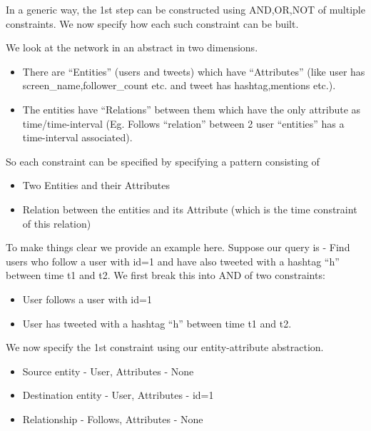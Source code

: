 \documentclass[letterpaper,10pt,english]{sphinxmanual}
\begin{document}
In a generic way, the 1st step can be constructed using AND,OR,NOT of multiple constraints. We now specify how each such constraint can be built.

We look at the network in an abstract in two dimensions.
\begin{itemize}
\item {} 
There are “Entities” (users and tweets) which have “Attributes” (like user has screen\_name,follower\_count etc. and tweet has hashtag,mentions etc.).

\item {} 
The entities have “Relations” between them which have the only attribute as time/time-interval (Eg. Follows “relation” between 2 user “entities” has a time-interval associated).

\end{itemize}

So each constraint can be specified by specifying a pattern consisting of
\begin{itemize}
\item {} 
Two Entities and their Attributes

\item {} 
Relation between the entities and its Attribute (which is the time constraint of this relation)

\end{itemize}

To make things clear we provide an example here.
Suppose our query is - Find users who follow a user with id=1 and have also tweeted with a hashtag “h” between time t1 and t2.
We first break this into AND of two constraints:
\begin{itemize}
\item {} 
User follows a user with id=1

\item {} 
User has tweeted with a hashtag “h” between time t1 and t2.

\end{itemize}

We now specify the 1st constraint using our entity-attribute abstraction.
\begin{itemize}
\item {} 
Source entity - User, Attributes - None

\item {} 
Destination entity - User, Attributes - id=1

\item {} 
Relationship - Follows, Attributes - None

\end{itemize}
\end{document}
